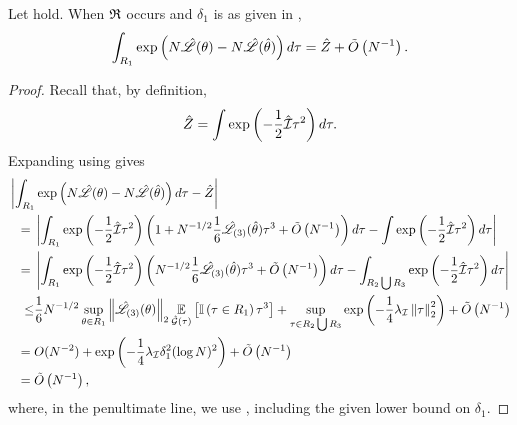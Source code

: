 \begin{lem}
%
Let  hold.  When $\mathfrak{R}$ occurs and $\delta_1$ is as
given in ,
%
\begin{align*}
%
\int_{R_1} \exp\left(
    N \likhat(\theta) - N \likhat(\thetahat)
\right) d\tau = \normalizer + \ordlog{N^{-1}}.
%
\end{align*}
%
\begin{proof}
%
Recall that, by definition,
%
\begin{align*}
%
\normalizer = \int \exp\left(-\frac{1}{2} \infohat \tau^2 \right) d\tau.
%
\end{align*}
%
Expanding using  gives
%
\begin{align*}
%
\MoveEqLeft
\left| \int_{R_1} \exp\left(
    N \likhat(\theta) - N \likhat(\thetahat)
\right) d\tau - \normalizer \right|
\\={}&
\left|
\int_{R_1} \exp\left(-\frac{1}{2} \infohat \tau^2 \right)
\left( 1 + N^{-1/2} \frac{1}{6} \likhatk{3}(\thetahat) \tau^3 +
    \ordlog{N^{-1}} \right) d\tau -
\int \exp\left(-\frac{1}{2} \infohat \tau^2 \right) d\tau
\right|
%
\\={}&
\left|
\int_{R_1} \exp\left(-\frac{1}{2} \infohat \tau^2 \right)
\left( N^{-1/2} \frac{1}{6} \likhatk{3}(\thetahat) \tau^3 +
    \ordlog{N^{-1}} \right) d\tau -
\int_{R_2 \bigcup R_3} \exp\left(-\frac{1}{2} \infohat \tau^2 \right) d\tau
\right|
%
\\\le&
\frac{1}{6} N^{-1/2} \sup_{\theta \in R_1} \norm{
    \likhatk{3}(\theta) }_2
\expect{\normhat}{\ind{\tau \in R_1}\tau^3} +
\sup_{\tau \in R_2 \bigcup R_3}
    \exp\left(-\frac{1}{4} \infoev \norm{\tau}_2^2 \right) +
\ordlog{N^{-1}}
%
\\={}&
O(N^{-2}) +
\exp\left(-\frac{1}{4} \infoev \delta_1^2 (\log N)^2 \right) +
\ordlog{N^{-1}}
\\={}& \ordlog{N^{-1}},
\end{align*}
%
where, in the penultimate line, we use ,
including the given lower bound on $\delta_1$.
%
\end{proof}
%
\end{lem}









